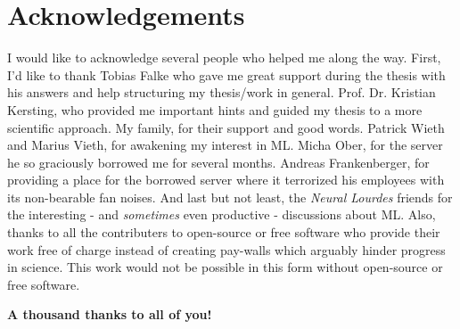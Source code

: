 \documentclass[report,type=bsc,colorback,accentcolor=tud9c,bigchapter,bibliography=totoc,11pt]{tudthesis}
\author{David Marlon Gengenbach}
\begin{document}
  \makethesistitle
  \tableofcontents
  \newpage
  \setcounter{page}{1}
  \abstract{}
  \newpage
  
  \newpage

  \printbibliography[heading=bibintoc]

  
  \listoffigures
  
  \listoftables
  
  \newpage
  \section*{Acknowledgements}
  I would like to acknowledge several people who helped me along the way.
  First, I'd like to thank Tobias Falke who gave me great support during the thesis with his answers and help structuring my thesis/work in general.
  Prof. Dr. Kristian Kersting, who provided me important hints and guided my thesis to a more scientific approach.
  My family, for their support and good words.
  Patrick Wieth and Marius Vieth, for awakening my interest in ML.
  Micha Ober, for the server he so graciously borrowed me for several months.
  Andreas Frankenberger, for providing a place for the borrowed server where it terrorized his employees with its non-bearable fan noises.
  And last but not least, the \textit{Neural Lourdes} friends for the interesting - and \textit{sometimes} even productive - discussions about ML.
  Also, thanks to all the contributers to open-source or free software who provide their work free of charge instead of creating pay-walls which arguably hinder progress in science.
  This work would not be possible in this form without open-source or free software.
  
  \vspace{0.5cm}
  \centering\textsf{\textbf{A thousand thanks to all of you!}}
\end{document}

